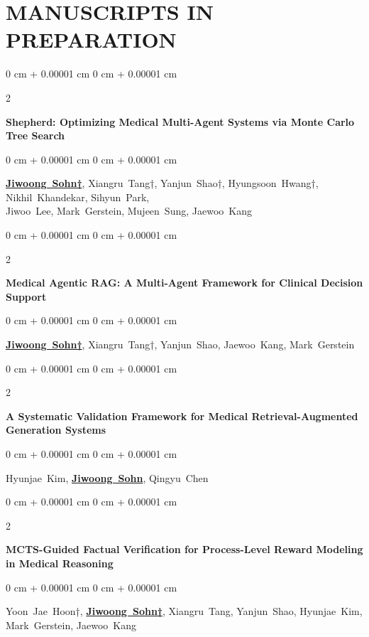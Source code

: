 \documentclass[10pt, letterpaper]{article}
\newenvironment{onecolentry}{
    \begin{adjustwidth}{
        0 cm + 0.00001 cm
    }{
        0 cm + 0.00001 cm
    }
}{
    \end{adjustwidth}
} %
\newenvironment{twocolentry}[2][]{
    \onecolentry
    \def\secondColumn{#2}
    \setcolumnwidth{\fill, 3.5 cm}
    \begin{paracol}{2}
}{
    \switchcolumn \raggedleft \secondColumn
    \end{paracol}
    \endonecolentry
} %
\begin{document}
\section{MANUSCRIPTS IN PREPARATION}
\vspace{0.1 cm}
       \begin{twocolentry}
            {
                2025
            }
            {
                \textbf{Shepherd: Optimizing Medical Multi-Agent Systems via Monte Carlo Tree Search}
            }
        \end{twocolentry}           
        \begin{onecolentry}
                \mbox{\textbf{\underline{Jiwoong Sohn†}}}, \mbox{Xiangru Tang†}, \mbox{Yanjun Shao†}, \mbox{Hyungsoon Hwang†}, \mbox{Nikhil Khandekar}, \mbox{Sihyun Park}, \\
                \mbox{Jiwoo Lee}, \mbox{Mark Gerstein}, \mbox{Mujeen Sung}, \mbox{Jaewoo Kang}
        \end{onecolentry}
    \vspace{0.2 cm}

       \begin{twocolentry}
            {
                2025
            }
            {
                \textbf{Medical Agentic RAG: A Multi-Agent Framework for Clinical Decision Support}
            }
        \end{twocolentry}           
        \begin{onecolentry}
                \mbox{\textbf{\underline{Jiwoong Sohn†}}}, \mbox{Xiangru Tang†}, \mbox{Yanjun Shao}, \mbox{Jaewoo Kang}, \mbox{Mark Gerstein}
        \end{onecolentry}
    \vspace{0.2 cm}

       \begin{twocolentry}
            {
                2025
            }
            {
                \textbf{A Systematic Validation Framework for Medical Retrieval-Augmented Generation Systems}
            }
        \end{twocolentry}           
        \begin{onecolentry}
                \mbox{Hyunjae Kim}, \mbox{\textbf{\underline{Jiwoong Sohn}}}, \mbox{Qingyu Chen}
        \end{onecolentry}
    \vspace{0.2 cm}

       \begin{twocolentry}
            {
                2025
            }
            {
                \textbf{MCTS-Guided Factual Verification for Process-Level Reward Modeling in Medical Reasoning}
            }
        \end{twocolentry}           
        \begin{onecolentry}
                \mbox{Yoon Jae Hoon†}, \mbox{\textbf{\underline{Jiwoong Sohn†}}}, \mbox{Xiangru Tang}, \mbox{Yanjun Shao}, \mbox{Hyunjae Kim}, \mbox{Mark Gerstein}, \mbox{Jaewoo Kang}
        \end{onecolentry}
    \vspace{0.2 cm}
\end{document}
